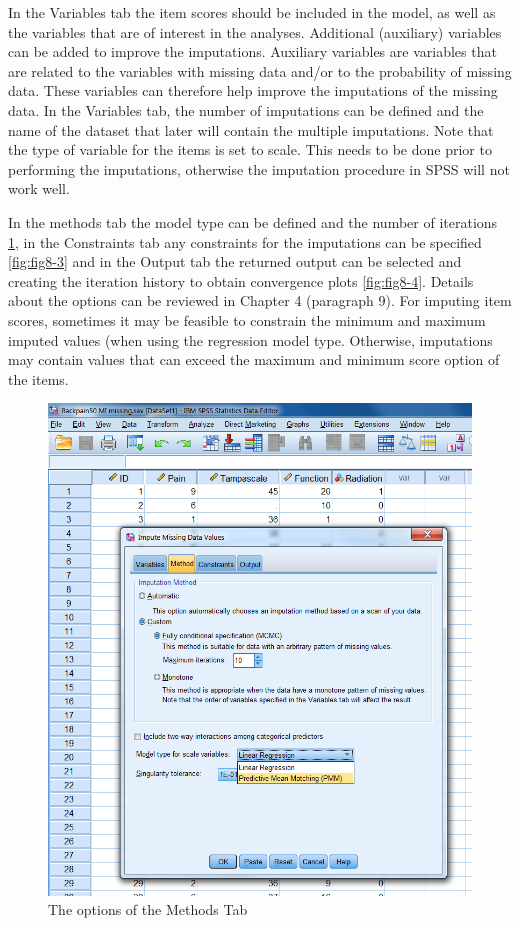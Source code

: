 \documentclass[]{book}
\begin{document}
In the Variables tab the item scores should be included in the model, as
well as the variables that are of interest in the analyses. Additional
(auxiliary) variables can be added to improve the imputations. Auxiliary
variables are variables that are related to the variables with missing
data and/or to the probability of missing data. These variables can
therefore help improve the imputations of the missing data. In the
Variables tab, the number of imputations can be defined and the name of
the dataset that later will contain the multiple imputations. Note that
the type of variable for the items is set to scale. This needs to be
done prior to performing the imputations, otherwise the imputation
procedure in SPSS will not work well.

In the methods tab the model type can be defined and the number of
iterations \ref{fig:fig8-2}, in the Constraints tab any constraints for
the imputations can be specified \ref{fig:fig8-3} and in the Output tab
the returned output can be selected and creating the iteration history
to obtain convergence plots \ref{fig:fig8-4}. Details about the options
can be reviewed in Chapter 4 (paragraph 9). For imputing item scores,
sometimes it may be feasible to constrain the minimum and maximum
imputed values (when using the regression model type. Otherwise,
imputations may contain values that can exceed the maximum and minimum
score option of the items.

\begin{figure}

{\centering \includegraphics[width=0.9\linewidth]{images/fig8.2} 

}

\caption{The options of the Methods Tab}\label{fig:fig8-2}
\end{figure}
\end{document}
